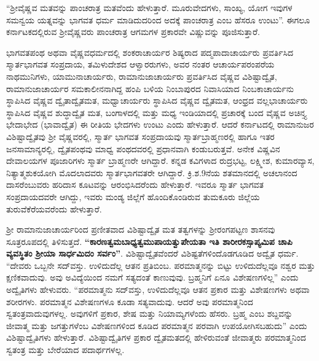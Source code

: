 “ಶ‍್ರೀವೈಷ್ಣವ ಮತವನ್ನು ಪಾಂಚರಾತ್ರ ಮತವೆಂದು ಹೇಳುತ್ತಾರೆ. ಮೂರುವೇದಗಳು, ಸಾಂಖ್ಯ, ಯೋಗ ಇವುಗಳ ಸಮನ್ವಯ ಯತ್ನವನ್ನು ಭಾಗವತ ಧರ್ಮ ಮಾಡಿದುದರಿಂದ ಅದಕ್ಕೆ ಪಾಂಚರಾತ್ರ ಎಂಬ ಹೆಸರೂ ಉಂಟು”. ಈಗಲೂ ಕರ್ನಾಟಕದಲ್ಲಿರುವ ಶ‍್ರೀವೈಷ್ಣವರು ಪಾಂಚರಾತ್ರ ಆಗಮಗಳ ಪ್ರಕಾರವೇ ವಿಷ್ಣುವನ್ನು ಪೂಜಿಸುತ್ತಾರೆ.

ಭಾಗವತಪಂಥ ಅಥವಾ ವೈಷ್ಣವಧರ್ಮದಲ್ಲಿ ಶಂಕರಾಚಾರ್ಯರ ಶಿಷ್ಯರಾದ ಪದ್ಮಪಾದಾಚಾರ್ಯರು ಪ್ರವರ್ತಿಸಿದ ಸ್ಮಾರ್ತಭಾಗವತ ಸಂಪ್ರದಾಯ, ತಮಿಳುದೇಶದ ಆಳ್ವಾರರುಗಳು, ಅವರ ನಂತರ ಆಚಾರ್ಯಪರಂಪರೆಯ ನಾಥಮುನಿಗಳು, ಯಾಮುನಾಚಾರ್ಯರು, ರಾಮಾನುಜಾಚಾರ್ಯರು ಪ್ರವರ್ತಿಸಿದ ವೈಷ್ಣವ ವಿಶಿಷ್ಟಾದ್ವೈತ, ರಾಮಾನುಜಾಚಾರ್ಯರ ಸಮಕಾಲೀನನಾಗಿದ್ದ ಹಂಪಿ ಬಳಿಯ ನಿಂಬಾಪುರದ ನಿವಾಸಿಯಾದ ನಿಂಬಕಾಚಾರ್ಯನು ಸ್ಥಾಪಿಸಿದ ವೈಷ್ಣವ ದ್ವೈತಾದ್ವೈತಮತ, ಮಧ್ವಾಚಾರ್ಯರು ಸ್ಥಾಪಿಸಿದ ವೈಷ್ಣವ ದ್ವೈತಮತ, ಆಂಧ್ರದ ವಲ್ಲಭಾಚಾರ್ಯರು ಸ್ಥಾಪಿಸಿದ ವೈಷ್ಣವ ಶುದ್ಧಾದ್ವೈತ ಮತ, ಬಂಗಾಳದಲ್ಲಿ ಮತ್ತು ಮಧ್ಯ ಇಂಡಿಯಾದಲ್ಲಿ ಪ್ರಚಾರಕ್ಕೆ ಬಂದ ವೈಷ್ಣವ ಅಚಿನ್ತ್ಯ ಭೇದಾಭೇದ (ಭಾವಾದ್ವೈತ) ಈ ರೀತಿಯ ಭೇದಗಳು ಉಂಟು ಎಂದು ಹೇಳುತ್ತಾರೆ. ಆದರೆ ಕರ್ನಾಟದಲ್ಲಿ ರಾಮಾನುಜರ ವಿಶಿಷ್ಟಾದ್ವೈತವು ಶ‍್ರೀ ವೈಷ್ಣವರಲ್ಲಿ, ಸ್ಮಾರ್ತ ಭಾಗವತ ಸಂಪ್ರದಾಯವು ಸ್ಮಾರ್ತಬ್ರಾಹ್ಮಣರಲ್ಲಿ ಹಾಗೂ ಇತರ ಜನಸಾಮಾನ್ಯರಲ್ಲಿ, ದ್ವೈತಪಂಥವು ಮಾಧ್ವ ಪಂಥದವರಲ್ಲಿ ಪ್ರಧಾನವಾಗಿ ಕಂಡುಬರುತ್ತವೆ. ಅನೇಕ ವಿಷ್ಣವಿನ ದೇವಾಲಯಗಳ ಪೂಜಾರಿಗಳು ಸ್ಮಾರ್ತ ಬ್ರಾಹ್ಮಣರೇ ಆಗಿದ್ದಾರೆ. ಕನ್ನಡ ಕವಿಗಳಾದ ರುದ್ರಭಟ್ಟ, ಲಕ್ಷ್ಮೀಶ, ಕುಮಾರವ್ಯಾಸ, ನಿತ್ಯಾತ್ಮಶುಕಯೋಗಿ ಮೊದಲಾದವರು ಸ್ಮಾರ್ತಭಾಗವತರೇ ಆಗಿದ್ದಾರೆ. ಕ್ರಿ.ಶ.9ನೆಯ ಶತಮಾನದಲ್ಲಿ ಅಚಲಾನಂದ ದಾಸರೆಂಬುವರು ಹರಿದಾಸ ಕೂಟವನ್ನು ಆರಂಭಿಸಿದರೆಂದು ಹೇಳುತ್ತಾರೆ. ಇವರೂ ಸ್ಮಾರ್ತ ಭಾಗವತ ಸಂಪ್ರದಾಯದವರೇ ಆಗಿದ್ದು, ಇವರು ಮಂಡ್ಯ ಜಿಲ್ಲೆಗೆ ಹೊಂದಿಕೊಂಡಿರುವ ತುಮಕೂರು ಜಿಲ್ಲೆಯ ತುರುವೆಕೆರೆಯವರೆಂದು ಹೇಳುತ್ತಾರೆ.

ಶ‍್ರೀ ರಾಮಾನುಜಾಚಾರ್ಯರಿಂದ ಪ್ರಣೀತವಾದ ವಿಶಿಷ್ಟಾದ್ವೈತ ಮತ ತತ್ವಗಳನ್ನು ಶ‍್ರೀರಂಗಪಟ್ಟಣ ಶಾಸನವು ಸೂತ್ರರೂಪದಲ್ಲಿ ತಿಳಿಸುತ್ತದೆ. \textbf{“ಕಾರಣತ್ವಮಬಾಧ್ಯತ್ವಮುಪಾಯತ್ವುಪೇಯತಾ ಇತಿ ಶಾರೀರಕಸ್ಸಾಪ್ಯಮಿಪ ಚಾಪಿ ವ್ಯವಸ್ಥಿತಂ ಶ‍್ರೀಯಾ ಸಾರ್ಧಮಿದಂ ಸರ್ವಂ”}. ವಿಶಿಷ್ಟಾದ್ವೈತವೆಂದರೆ ವಿಶಿಷ್ಟತೆಗಳಿಂದೊಡಗೂಡಿದ ಅದ್ವೈತ ಧರ್ಮ. “ದೇವರು ಒಬ್ಬನೇ ಸದ್​ವಸ್ತು. ಉಳಿದುದೆಲ್ಲ ಆತನ ಪ್ರತಿಬಿಂಬ. ಪರಮಾತ್ಮನನ್ನು ಬಿಟ್ಟು ಉಳಿದುದೆಲ್ಲವೂ ನಶ್ವರ ಮತ್ತು ಕ್ಷಣಿಕವಾದುವು. ಅವು ಅವಿದ್ಯೆಯಿಂದ ನಮಗೆ ಸತ್ಯದಂತೆ ಕಾಣುವುವು. ಬ್ರಹ್ಮನಿಗೆ ಏನೂ ವಿಶೇಷಣಗಳಿಲ್ಲ” ಎಂದು ಅದ್ವೈತಿಗಳು ಹೇಳುವರು. “ಪರಮಾತ್ಮನು ಸದ್​ವಸ್ತು, ಉಳಿದುದೆಲ್ಲವೂ ಆತನ ಪ್ರಕಾರ ಮತ್ತು ವಿಶೇಷಣಗಳು ಅಥವಾ ಶರೀರಗಳು. ಪರಮಾತ್ಮನ ವಿಶೇಷಣಗಳೂ ಕೂಡಾ ಸತ್ಯವಾದುವು. ಆದರೆ ಅವು ಪರಮಾತ್ಮನಿಂದ ಸ್ವತಂತ್ರವಾದುವುಗಳಲ್ಲ. ಅವುಗಳಿಗೆ ಪ್ರಕಾರ, ಶೇಷ ಮತ್ತು ನಿಯಾಮ್ಯಗಳೆಂದು ಹೆಸರು. ಬ್ರಹ್ಮ ಎಂಬ ಶಬ್ದವನ್ನು ಜೀವಾತ್ಮ ಮತ್ತು ಜಗತ್ತುಗಳೆಂಬ ವಿಶೇಷಣಗಳಿಂದ ಕೂಡಿದ ಪರಮಾತ್ಮನ ಪರವಾಗಿ ಉಪಯೋಗಿಸಬಹುದು” ಎಂದು ವಿಶಿಷ್ಟಾದ್ವೈತಿಗಳು ಹೇಳುತ್ತಾರೆ. ವಿಶಿಷ್ಟಾದ್ವೈತಿಗಳ ಪ್ರಕಾರ ದ್ವೈತಮತದಲ್ಲಿ ಹೇಳಿರುವಂತೆ ಜೀವಾತ್ಮರು ಪರಮಾತ್ಮನಿಂದ ಸ್ವತಂತ್ರ ಮತ್ತು ಬೇರೆಯಾದ ಪದಾರ್ಥಗಳಲ್ಲ.

